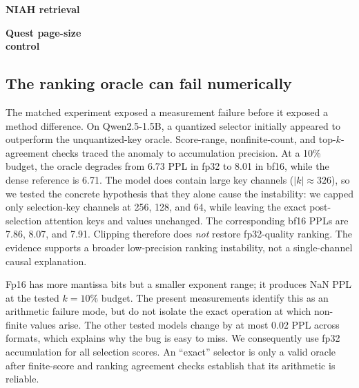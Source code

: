 \documentclass[sigplan,anonymous,review,nonacm]{acmart}
\begin{document}
\begin{table}[t]
\centering\small
\caption{Two controls for selection granularity (Qwen2.5-0.5B, 16K). Left: NIAH
retrieval rate with 95\% paired bootstrap intervals. Right: PPL of the same Quest
implementation as its page size changes (dense PPL 9.17).}
\label{tab:retrieval_pages}
\begin{minipage}[t]{0.47\textwidth}
\centering\textbf{NIAH retrieval}\\[1pt]
\resizebox{\linewidth}{!}{}
\end{minipage}\hfill
\begin{minipage}[t]{0.43\textwidth}
\centering\textbf{Quest page-size}\\[-1pt]
\textbf{control}\\[1pt]
\resizebox{\linewidth}{!}{}
\end{minipage}
\end{table}

\subsection{The ranking oracle can fail numerically}
The matched experiment exposed a measurement failure before it exposed a method
difference. On Qwen2.5-1.5B, a quantized selector initially appeared to outperform
the unquantized-key oracle. Score-range, nonfinite-count, and top-$k$-agreement checks
traced the anomaly to accumulation precision. At a 10\% budget, the oracle degrades
from 6.73 PPL in fp32 to 8.01 in bf16, while the dense reference is 6.71. The model
does contain large key channels ($|k|\!\approx\!326$), so we tested the concrete
hypothesis that they alone cause the instability: we capped only selection-key
channels at 256, 128, and 64, while leaving the exact post-selection attention keys
and values unchanged. The corresponding bf16 PPLs are 7.86, 8.07, and 7.91. Clipping
therefore does \emph{not} restore fp32-quality ranking. The evidence supports a
broader low-precision ranking instability, not a single-channel causal explanation.

Fp16 has more mantissa bits but a smaller exponent range; it produces NaN PPL at the
tested $k{=}10\%$ budget. The present measurements identify this as an arithmetic
failure mode, but do not isolate the exact operation at which non-finite values arise.
The other tested models change by at most 0.02 PPL across formats, which explains why
the bug is easy to miss. We consequently use fp32 accumulation for all selection
scores. An ``exact'' selector is only a valid oracle after finite-score and ranking
agreement checks establish that its arithmetic is reliable.
\end{document}
